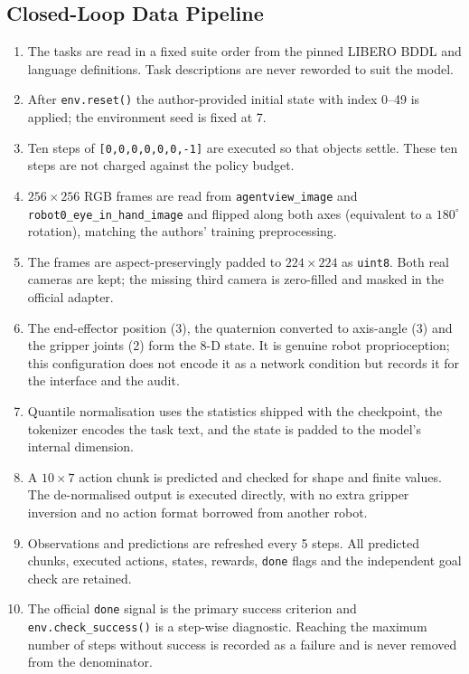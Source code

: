 \subsection{Closed-Loop Data Pipeline}
\label{sec:pi05-pipeline}

\begin{enumerate}
  \item The tasks are read in a fixed suite order from the pinned LIBERO BDDL
        and language definitions. Task descriptions are never reworded to suit
        the model.
  \item After \texttt{env.reset()} the author-provided initial state with index
        0--49 is applied; the environment seed is fixed at 7.
  \item Ten steps of \texttt{[0,0,0,0,0,0,-1]} are executed so that objects
        settle. These ten steps are not charged against the policy budget.
  \item $256 \times 256$ RGB frames are read from \texttt{agentview\_image} and
        \texttt{robot0\_eye\_in\_hand\_image} and flipped along both axes
        (equivalent to a $180^{\circ}$ rotation), matching the authors'
        training preprocessing.
  \item The frames are aspect-preservingly padded to $224 \times 224$ as
        \texttt{uint8}. Both real cameras are kept; the missing third camera is
        zero-filled and masked in the official adapter.
  \item The end-effector position (3), the quaternion converted to axis-angle
        (3) and the gripper joints (2) form the 8-D state. It is genuine robot
        proprioception; this configuration does not encode it as a network
        condition but records it for the interface and the audit.
  \item Quantile normalisation uses the statistics shipped with the checkpoint,
        the tokenizer encodes the task text, and the state is padded to the
        model's internal dimension.
  \item A $10 \times 7$ action chunk is predicted and checked for shape and
        finite values. The de-normalised output is executed directly, with no
        extra gripper inversion and no action format borrowed from another
        robot.
  \item Observations and predictions are refreshed every 5 steps. All predicted
        chunks, executed actions, states, rewards, \texttt{done} flags and the
        independent goal check are retained.
  \item The official \texttt{done} signal is the primary success criterion and
        \texttt{env.check\_success()} is a step-wise diagnostic. Reaching the
        maximum number of steps without success is recorded as a failure and is
        never removed from the denominator.
\end{enumerate}


